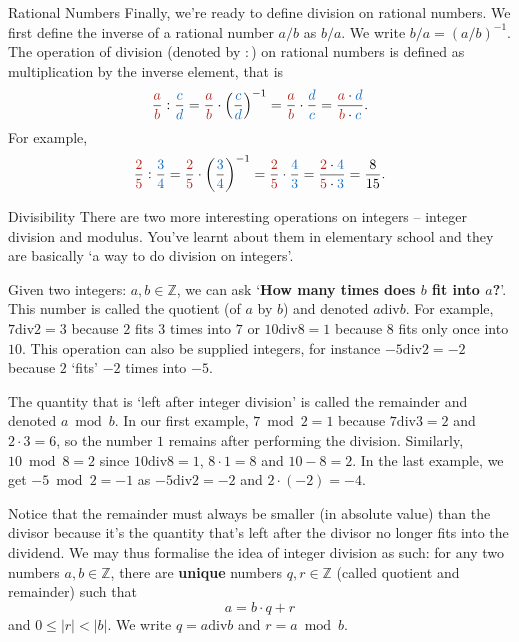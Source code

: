 \documentclass[final]{beamer}
\newlength{\colwidth}
\newcommand{\Z}{\mathbb{Z}}
\newcommand{\dv}{\mathbin{\mathrm{div}}}
\newcommand{\clr}{\textcolor{BrickRed}}
\newcommand{\clb}{\textcolor{RoyalBlue}}
\begin{document}
\begin{frame}[t]
\begin{columns}[t]
\begin{column}{\colwidth}
\begin{exampleblock}{Rational Numbers}
 Finally, we're ready to \alert{define division} on rational numbers. We first
 define the \alert{inverse} of a rational number $a / b$ as $b / a$. We write $b
 / a = (a / b)^{-1}$. The \alert{operation of division} (denoted by $:$) on
 rational numbers is defined as \alert{multiplication by the inverse element},
 that is
 \[
  \frac{\clr{a}}{\clr{b}} : \frac{\clb{c}}{\clb{d}} = \frac{\clr{a}}{\clr{b}}
  \cdot \left( \frac{\clb{c}}{\clb{d}} \right)^{-1} = \frac{\clr{a}}{\clr{b}}
  \cdot \frac{\clb{d}}{\clb{c}} = \frac{\clr{a} \cdot \clb{d}}{\clr{b} \cdot
  \clb{c}}.
 \]
 For example,
 \[
  \frac{\clr{2}}{\clr{5}} : \frac{\clb{3}}{\clb{4}} = \frac{\clr{2}}{\clr{5}}
 \cdot \left(\frac{\clb{3}}{\clb{4}}\right)^{-1} = \frac{\clr{2}}{\clr{5}} \cdot
 \frac{\clb{4}}{\clb{3}} = \frac{\clr{2} \cdot \clb{4}}{\clr{5} \cdot \clb{3}} =
 \frac{8}{15}.
 \]
\end{exampleblock}

\begin{alertblock}{Divisibility}
 There are two more interesting operations on integers -- \alert{integer
 division} and \alert{modulus}. You've learnt about them in elementary school
 and they are basically `a way to do \alert{division on integers}'.

 Given two integers: $a,b \in \Z$, we can ask `\textbf{How many times does $b$
 fit into $a$?}'. This number is called the \alert{quotient} (of $a$ by $b$) and
 denoted \alert{$a \dv b$}. For example, $7 \dv 2 = 3$ because $2$ fits $3$
 times into $7$ or $10 \dv 8 = 1$ because $8$ fits only once into $10$. This
 operation can also be supplied integers, for instance $-5 \dv 2 = -2$ because
 $2$ `fits' $-2$ times into $-5$.

 The quantity that is `left after integer division' is called the
 \alert{remainder} and denoted $a \bmod b$. In our first example, $7 \bmod 2 =
 1$ because $7 \dv 3 = 2$ and $2 \cdot 3 = 6$, so the number $1$ remains after
 performing the division. Similarly, $10 \bmod 8 = 2$ since $10 \dv 8 = 1$, $8
 \cdot 1 = 8$ and $10 - 8 = 2$. In the last example, we get $-5 \bmod 2 = -1$ as
 $-5 \dv 2 = -2$ and $2 \cdot (-2) = -4$.

 Notice that the \alert{remainder must always be smaller (in absolute value)
 than the divisor} because it's the quantity that's left after the divisor no
 longer fits into the dividend. We may thus formalise the idea of \alert{integer
 division as such}: for any two numbers $a,b \in \Z$, there are \textbf{unique}
 numbers $q,r \in \Z$ (called \alert{quotient} and \alert{remainder}) such that
 \[
  a = b \cdot q + r
 \]
 and $0 \leq |r| < |b|$. We write $q = a \dv b$ and $r = a \bmod b$.


\end{alertblock}
\end{column}
\end{columns}
\end{frame}
\end{document}
